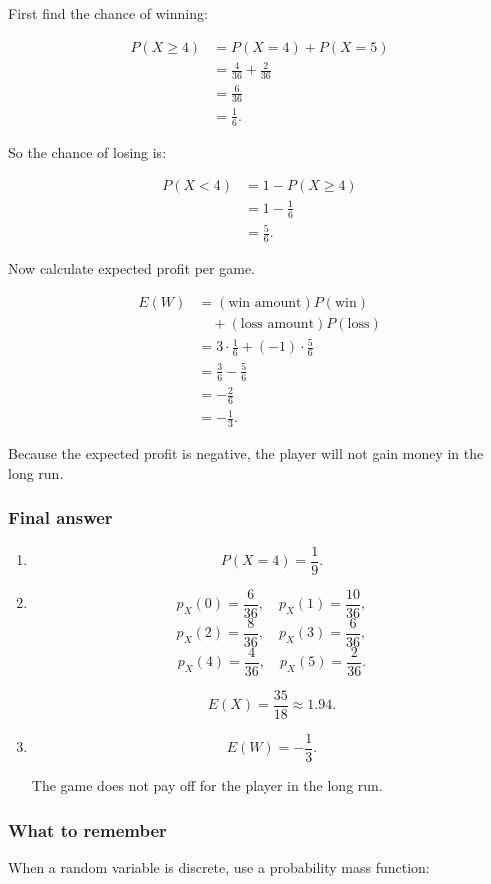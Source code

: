 \documentclass[10pt]{article}
\begin{document}
First find the chance of winning:

\begin{align*}
P(X\ge 4)
&=
P(X=4)+P(X=5)\\[2mm]
&=
\frac{4}{36}
+
\frac{2}{36}\\[2mm]
&=
\frac{6}{36}\\[2mm]
&=
\frac{1}{6}.
\end{align*}

So the chance of losing is:

\begin{align*}
P(X<4)
&=
1-P(X\ge 4)\\[2mm]
&=
1-\frac{1}{6}\\[2mm]
&=
\frac{5}{6}.
\end{align*}

Now calculate expected profit per game.

\begin{align*}
E(W)
&=
(\text{win amount})P(\text{win})\\
&\quad+
(\text{loss amount})P(\text{loss})\\[2mm]
&=
3\cdot\frac{1}{6}
+
(-1)\cdot\frac{5}{6}\\[2mm]
&=
\frac{3}{6}
-
\frac{5}{6}\\[2mm]
&=
-\frac{2}{6}\\[2mm]
&=
-\frac{1}{3}.
\end{align*}

Because the expected profit is negative, the player will not gain money
in the long run.

\subsubsection*{Final answer}
\begin{enumerate}[label=\alph*)]
\item
\[
P(X=4)=\frac{1}{9}.
\]

\item
\[
p_X(0)=\frac{6}{36},
\quad
p_X(1)=\frac{10}{36},
\]
\[
p_X(2)=\frac{8}{36},
\quad
p_X(3)=\frac{6}{36},
\]
\[
p_X(4)=\frac{4}{36},
\quad
p_X(5)=\frac{2}{36}.
\]

\[
E(X)=\frac{35}{18}\approx 1.94.
\]

\item
\[
E(W)=-\frac{1}{3}.
\]

The game does not pay off for the player in the long run.
\end{enumerate}

\subsubsection*{What to remember}
When a random variable is discrete, use a probability mass function:
\end{document}
